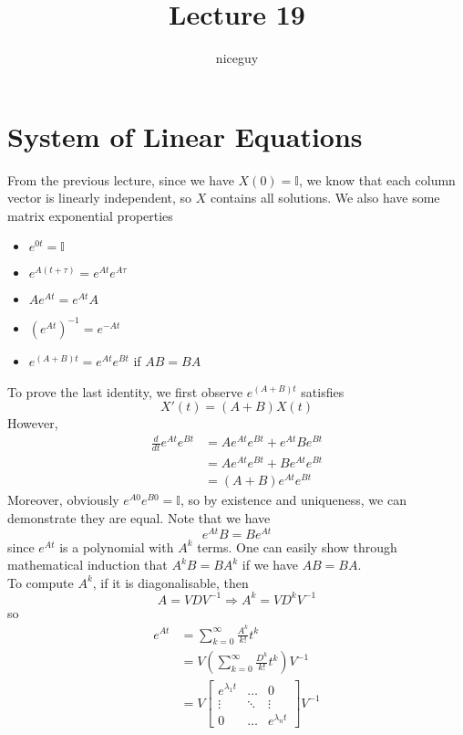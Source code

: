 \documentclass[12pt]{article}
\author{niceguy}
\title{Lecture 19}
\begin{document}
\maketitle

\section{System of Linear Equations}

From the previous lecture, since we have $X(0) = \mathbb{I}$, we know that each column vector is linearly independent, so $X$ contains all solutions. We also have some matrix exponential properties

\begin{itemize}
	\item $e^{0t} = \mathbb{I}$
	\item $e^{A(t+\tau)} = e^{At}e^{A\tau}$
	\item $Ae^{At} = e^{At}A$
	\item $\left(e^{At}\right)^{-1} = e^{-At}$
	\item $e^{(A+B)t} = e^{At}e^{Bt}$ if $AB = BA$
\end{itemize}

To prove the last identity, we first observe $e^{(A+B)t}$ satisfies
$$X'(t) = (A+B)X(t)$$
However,
\begin{align*}
	\frac{d}{dt} e^{At}e^{Bt} &= Ae^{At}e^{Bt} + e^{At}Be^{Bt} \\
				  &= Ae^{At}e^{Bt} + Be^{At}e^{Bt} \\
				  &= (A+B)e^{At}e^{Bt}
\end{align*}
Moreover, obviously $e^{A0}e^{B0} = \mathbb{I}$, so by existence and uniqueness, we can demonstrate they are equal. Note that we have
$$e^{At}B = Be^{At}$$
since $e^{At}$ is a polynomial with $A^k$ terms. One can easily show through mathematical induction that $A^kB = BA^k$ if we have $AB = BA$. \\
To compute $A^k$, if it is diagonalisable, then
$$A = VDV^{-1} \Rightarrow A^k = VD^kV^{-1}$$
so
\begin{align*}
	e^{At} &= \sum_{k=0}^\infty \frac{A^k}{k!}t^k \\
	       &= V\left(\sum_{k=0}^\infty \frac{D^k}{k!}t^k\right)V^{-1} \\
	       &= V\begin{bmatrix} e^{\lambda_1t} & \dots & 0 \\ \vdots & \ddots & \vdots \\ 0 & \dots & e^{\lambda_nt}\end{bmatrix}V^{-1}
\end{align*}
\end{document}
